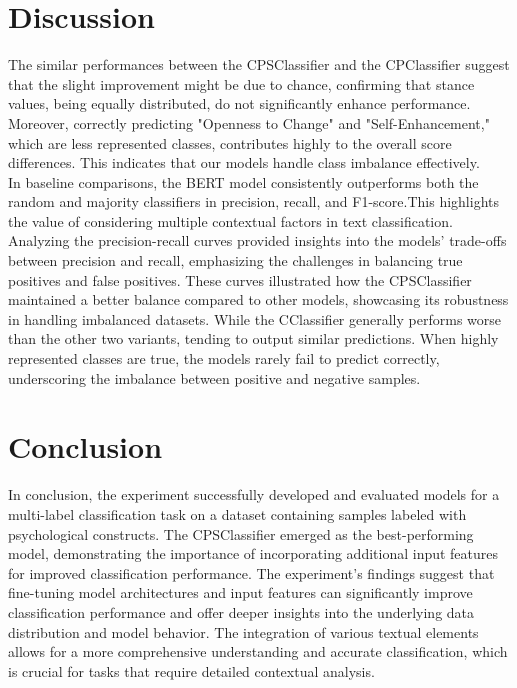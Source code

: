 \documentclass[11pt]{article}
\begin{document}
\section{Discussion}
\label{sec:discussion}
The similar performances between the CPSClassifier and the CPClassifier suggest that the slight improvement might be due to chance, confirming that stance values, being equally distributed, do not significantly enhance performance.
\\Moreover, correctly predicting "Openness to Change" and "Self-Enhancement," which are less represented classes, contributes highly to the overall score differences. This indicates that our models handle class imbalance effectively. 
\\In baseline comparisons, the BERT model consistently outperforms both the random and majority classifiers in precision, recall, and F1-score.This highlights the value of considering multiple contextual factors in text classification.
\\Analyzing the precision-recall curves provided insights into the models' trade-offs between precision and recall, emphasizing the challenges in balancing true positives and false positives. These curves illustrated how the CPSClassifier maintained a better balance compared to other models, showcasing its robustness in handling imbalanced datasets. While the CClassifier generally performs worse than the other two variants, tending to output similar predictions. When highly represented classes are true, the models rarely fail to predict correctly, underscoring the imbalance between positive and negative samples.

\section{Conclusion}
\label{sec:conclusion}
In conclusion, the experiment successfully developed and evaluated models for a multi-label classification task on a dataset containing samples labeled with psychological constructs. The CPSClassifier emerged as the best-performing model, demonstrating the importance of incorporating additional input features for improved classification performance. The experiment's findings suggest that fine-tuning model architectures and input features can significantly improve classification performance and offer deeper insights into the underlying data distribution and model behavior. The integration of various textual elements allows for a more comprehensive understanding and accurate classification, which is crucial for tasks that require detailed contextual analysis.
\end{document}
